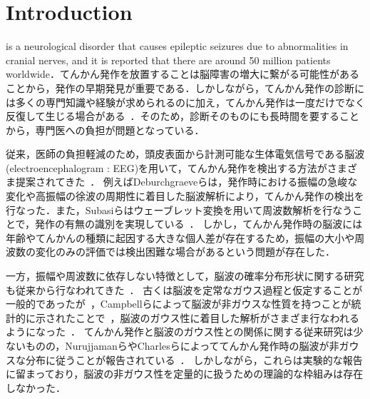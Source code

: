\documentclass[journal]{IEEEtran}
\begin{document}
\section{Introduction}
%
%
%
%
 is a neurological disorder that causes epileptic seizures due to abnormalities in cranial nerves, and it is reported that there are around 50 million patients worldwide\cite{WHO}．てんかん発作を放置することは脳障害の増大に繋がる可能性があることから，発作の早期発見が重要である．しかしながら，てんかん発作の診断には多くの専門知識や経験が求められるのに加え，てんかん発作は一度だけでなく反復して生じる場合がある~\cite{ep2011}．そのため，診断そのものにも長時間を要することから，専門医への負担が問題となっている．

従来，医師の負担軽減のため，頭皮表面から計測可能な生体電気信号である脳波(electroencephalogram : EEG)を用いて，てんかん発作を検出する方法がさまざま提案されてきた~\cite{Deburchgraeve2008,Subasi2005,kellaway1979precise,Panzica1999,fusco1993ictal,Acir2005,Greene2008}．
例えばDeburchgraeveらは，発作時における振幅の急峻な変化や高振幅の徐波の周期性に着目した脳波解析により，てんかん発作の検出を行なった\cite{Deburchgraeve2008}．また，Subasiらはウェーブレット変換を用いて周波数解析を行なうことで，発作の有無の識別を実現している~\cite{Subasi2005}．
しかし，てんかん発作時の脳波には年齢やてんかんの種類に起因する大きな個人差が存在するため，振幅の大小や周波数の変化のみの評価では検出困難な場合があるという問題が存在した．

一方，振幅や周波数に依存しない特徴として，脳波の確率分布形状に関する研究も従来から行なわれてきた~\cite{Sounders1963,Gonen2012,Campbell1967,Weiss1973,Nurujjaman2009,Charles1999}．
古くは脳波を定常なガウス過程と仮定することが一般的であったが~\cite{Sounders1963,Gonen2012}，Campbellらによって脳波が非ガウスな性質を持つことが統計的に示されたことで~\cite{Campbell1967}，脳波のガウス性に着目した解析がさまざま行なわれるようになった~\cite{Gonen2012,Weiss1973,Nurujjaman2009,Charles1999}．
てんかん発作と脳波のガウス性との関係に関する従来研究は少ないものの，NurujjamanらやCharlesらによっててんかん発作時の脳波が非ガウスな分布に従うことが報告されている~\cite{Nurujjaman2009,Charles1999}．
しかしながら，これらは実験的な報告に留まっており，脳波の非ガウス性を定量的に扱うための理論的な枠組みは存在しなかった．
\end{document}
